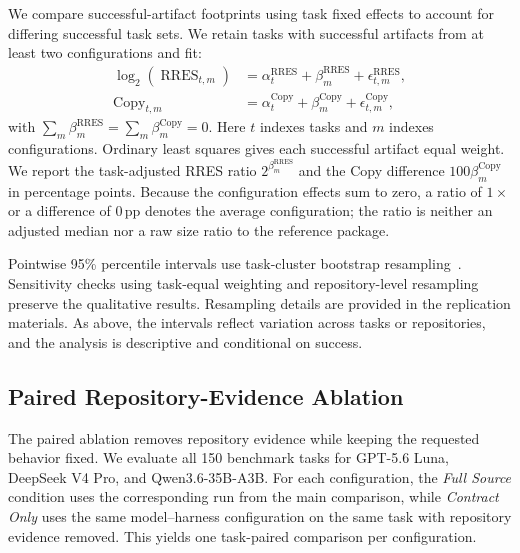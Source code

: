 \documentclass[acmsmall,screen,review,anonymous]{acmart}
\begin{document}
We compare successful-artifact footprints using task fixed effects to account
for differing successful task sets. We retain tasks with successful artifacts
from at least two configurations and fit:
\begin{equation}
\begin{aligned}
  \log_2\!\left(\operatorname{RRES}_{t,m}\right)
    &= \alpha_t^{\mathrm{RRES}} + \beta_m^{\mathrm{RRES}}
       + \epsilon_{t,m}^{\mathrm{RRES}}, \\
  \operatorname{Copy}_{t,m}
    &= \alpha_t^{\mathrm{Copy}} + \beta_m^{\mathrm{Copy}}
       + \epsilon_{t,m}^{\mathrm{Copy}},
\end{aligned}
\label{eq:adjusted-footprint}
\end{equation}
with $\sum_m\beta_m^{\mathrm{RRES}}=\sum_m\beta_m^{\mathrm{Copy}}=0$.
Here $t$ indexes tasks and $m$ indexes configurations. Ordinary least squares
gives each successful artifact equal weight. We report the task-adjusted RRES
ratio $2^{\beta_m^{\mathrm{RRES}}}$ and the Copy difference
$100\beta_m^{\mathrm{Copy}}$ in percentage points. Because the configuration
effects sum to zero, a ratio of $1\times$ or a difference of 0\,pp denotes the
average configuration; the ratio is neither an adjusted median nor a raw size
ratio to the reference package.

Pointwise 95\% percentile intervals use task-cluster bootstrap
resampling~\cite{field2007cluster}. Sensitivity checks using task-equal weighting
and repository-level resampling preserve the qualitative results. Resampling
details are provided in the replication materials. As above, the intervals
reflect variation across tasks or repositories, and the analysis is descriptive
and conditional on success.

\subsection{Paired Repository-Evidence Ablation}
\label{sec:source-ablation-protocol}

The paired ablation removes repository evidence while keeping the requested
behavior fixed. We evaluate all 150 benchmark tasks for GPT-5.6 Luna,
DeepSeek V4 Pro, and Qwen3.6-35B-A3B. For each configuration, the
\emph{Full Source} condition uses the corresponding run from the main
comparison, while \emph{Contract Only} uses the same model--harness
configuration on the same task with repository evidence removed. This yields
one task-paired comparison per configuration.
\end{document}
